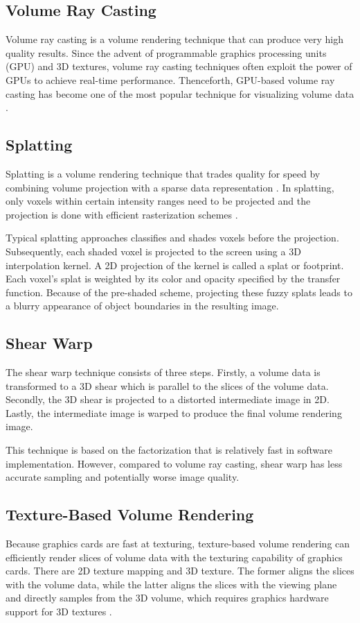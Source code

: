 \subsection{Volume Ray Casting}
Volume ray casting is a volume rendering technique that can produce very high quality results.
Since the advent of programmable graphics processing units (GPU) and 3D textures, volume ray casting techniques often exploit the power of GPUs to achieve real-time performance. Thenceforth, GPU-based volume ray casting has become one of the most popular technique for visualizing volume data \cite{meyer-spradow_voreen:_2009}.

\subsection{Splatting}
Splatting is a volume rendering technique that trades quality for speed by combining volume projection with a sparse data representation \cite{westover_splatting:_1991}. In splatting, only voxels within certain intensity ranges need to be projected and the projection is done with efficient rasterization schemes \cite{mueller_splatting_1999}.

Typical splatting approaches classifies and shades voxels before the projection. Subsequently, each shaded voxel is projected to the screen using a 3D interpolation kernel. A 2D projection of the kernel is called a splat or footprint.
Each voxel's splat is weighted by its color and opacity specified by the transfer function.
Because of the pre-shaded scheme, projecting these fuzzy splats leads to a blurry appearance of object boundaries in the resulting image.

\subsection{Shear Warp}
The shear warp technique \cite{lacroute_fast_1994} consists of three steps. Firstly, a volume data is transformed to a 3D shear which is parallel to the slices of the volume data. Secondly, the 3D shear is projected to a distorted intermediate image in 2D. Lastly, the intermediate image is warped to produce the final volume rendering image.

This technique is based on the factorization that is relatively fast in software implementation. However, compared to volume ray casting, shear warp has less accurate sampling and potentially worse image quality.

\subsection{Texture-Based Volume Rendering}
Because graphics cards are fast at texturing, texture-based volume rendering \cite{hibbard_interactivity_1989} can efficiently render slices of volume data with the texturing capability of graphics cards. There are 2D texture mapping and 3D texture. The former aligns the slices with the volume data, while the latter aligns the slices with the viewing plane and directly samples from the 3D volume, which requires graphics hardware support for 3D textures \cite{westermann_accelerated_2001}.

